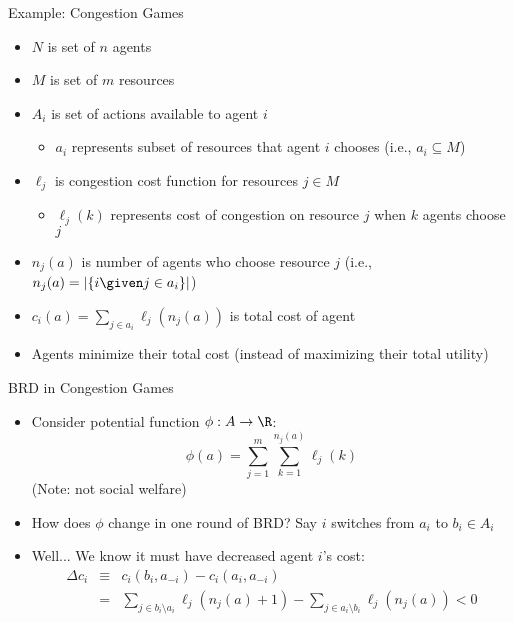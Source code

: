 \documentclass[11pt,aspectratio=169,handout]{beamer}
\begin{document}
  
  \begin{frame}{Example: Congestion Games}
   \begin{itemize}[<+->]
   \setlength{\itemsep}{0.7em}
    \item $N$ is set of $n$ agents
    \item $M$ is set of $m$ \alert{resources}
    \item $A_i$ is set of actions available to agent $i$
    \begin{itemize}
     \item $a_i$ represents subset of resources that agent $i$ chooses (i.e., $a_i \subseteq M$)
    \end{itemize}
    \item $\ell_j$ is \alert{congestion cost function} for resources $j \in M$
    \begin{itemize}
     \item $\ell_j(k)$ represents cost of congestion on resource $j$ when $k$ agents choose $j$
    \end{itemize}
    \item $n_j(a)$ is number of agents who choose resource $j$ (i.e., $n_j(a) = \vert\{i \given j \in a_i\}\vert$)
    \item $c_i(a) = \sum_{j \in a_i} \ell_j(n_j(a))$ is total cost of agent
    \item Agents minimize their total cost (instead of maximizing their total utility)
   \end{itemize}
  \end{frame}
  
  
  \begin{frame}{BRD in Congestion Games}
   \begin{itemize}
    \item<1-> Consider \alert{potential function}  $\phi:A\rightarrow \R$:
    $$\phi(a) = \sum_{j=1}^m \sum_{k=1}^{n_j(a)} \ell_j(k)$$
    (Note: \alert{not} social welfare)
    \item<2-> How does $\phi$ change in one round of BRD? Say $i$ switches from $a_i$ to $b_i \in A_i$
    \item<3->Well... We know it must have decreased agent $i$'s cost:
    \begin{eqnarray*}
     \Delta c_i & \equiv & c_i(b_i, a_{-i}) - c_i(a_i, a_{-i}) \\ 
     & = & \sum_{j \in b_i\setminus a_i}\ell_j(n_j(a)+1) - \sum_{j \in a_i \setminus b_i}\ell_j(n_j(a)) < 0
    \end{eqnarray*}
   \end{itemize}
  \end{frame}
  
\end{document}
